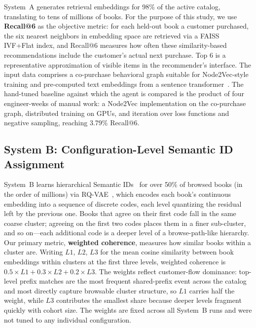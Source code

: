 \documentclass[conference]{IEEEtran}
\begin{document}
System~A generates retrieval embeddings for 98\% of the active catalog, translating to tens of millions of books. For the purpose of this study, we use \textbf{Recall@6} as the objective metric: for each held-out book a customer purchased, the six nearest neighbors in embedding space are retrieved via a FAISS~\cite{johnson2019faiss} IVF+Flat index, and Recall@6 measures how often these similarity-based recommendations include the customer's actual next purchase. Top 6 is a representative approximation of visible items in the recommender's interface. The input data comprises a co-purchase behavioral graph suitable for Node2Vec-style~\cite{grover2016node2vec} training and pre-computed text embeddings from a sentence transformer~\cite{reimers2019sbert}. The hand-tuned baseline against which the agent is compared is the product of four engineer-weeks of manual work: a Node2Vec implementation on the co-purchase graph, distributed training on GPUs, and iteration over loss functions and negative sampling, reaching 3.79\% Recall@6.

\subsection{System B: Configuration-Level Semantic ID Assignment}

System~B learns hierarchical Semantic IDs~\cite{rajput2024genret} for over 50\% of browsed books (in the order of millions) via RQ-VAE~\cite{vandenoord2017vqvae,zeghidour2021soundstream}, which encodes each book's continuous embedding into a sequence of discrete codes, each level quantizing the residual left by
the previous one. Books that agree on their first code fall in the same coarse cluster; agreeing on the first two codes places them in a finer sub-cluster, and so on---each additional code is a deeper level of a browse-path-like hierarchy. Our primary metric, \textbf{weighted coherence}, measures how similar books within a cluster are. Writing $L1$, $L2$, $L3$ for the mean cosine similarity between book embeddings within clusters at the first three levels, weighted coherence is $0.5 \times L1 + 0.3 \times L2 + 0.2 \times L3$. The weights reflect customer-flow dominance: top-level prefix matches are the most frequent shared-prefix event across the catalog and most directly capture browsable cluster structure, so $L1$ carries half the weight, while $L3$ contributes the smallest share because deeper levels fragment quickly with cohort size. The weights are fixed across all System~B runs and were not tuned to any individual configuration. 
\end{document}

